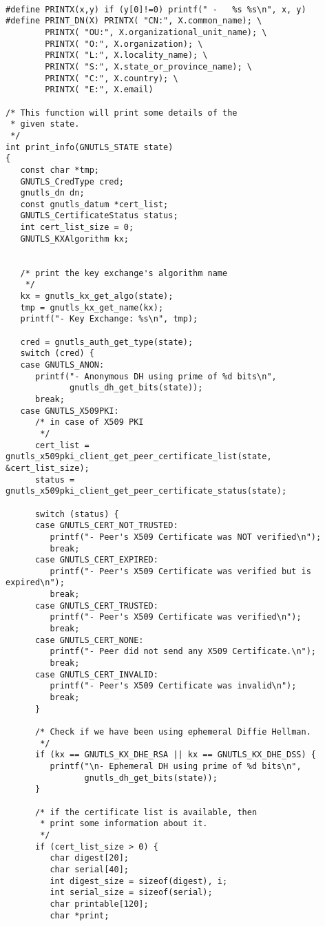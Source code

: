 \begin{verbatim}

#define PRINTX(x,y) if (y[0]!=0) printf(" -   %s %s\n", x, y)
#define PRINT_DN(X) PRINTX( "CN:", X.common_name); \
        PRINTX( "OU:", X.organizational_unit_name); \
        PRINTX( "O:", X.organization); \
        PRINTX( "L:", X.locality_name); \
        PRINTX( "S:", X.state_or_province_name); \
        PRINTX( "C:", X.country); \
        PRINTX( "E:", X.email)

/* This function will print some details of the
 * given state.
 */
int print_info(GNUTLS_STATE state)
{
   const char *tmp;
   GNUTLS_CredType cred;
   gnutls_dn dn;
   const gnutls_datum *cert_list;
   GNUTLS_CertificateStatus status;
   int cert_list_size = 0;
   GNUTLS_KXAlgorithm kx;


   /* print the key exchange's algorithm name
    */
   kx = gnutls_kx_get_algo(state);
   tmp = gnutls_kx_get_name(kx);
   printf("- Key Exchange: %s\n", tmp);

   cred = gnutls_auth_get_type(state);
   switch (cred) {
   case GNUTLS_ANON:
      printf("- Anonymous DH using prime of %d bits\n",
             gnutls_dh_get_bits(state));
      break;
   case GNUTLS_X509PKI:
      /* in case of X509 PKI
       */
      cert_list = gnutls_x509pki_client_get_peer_certificate_list(state, &cert_list_size);
      status = gnutls_x509pki_client_get_peer_certificate_status(state);

      switch (status) {
      case GNUTLS_CERT_NOT_TRUSTED:
         printf("- Peer's X509 Certificate was NOT verified\n");
         break;
      case GNUTLS_CERT_EXPIRED:
         printf("- Peer's X509 Certificate was verified but is expired\n");
         break;
      case GNUTLS_CERT_TRUSTED:
         printf("- Peer's X509 Certificate was verified\n");
         break;
      case GNUTLS_CERT_NONE:
         printf("- Peer did not send any X509 Certificate.\n");
         break;
      case GNUTLS_CERT_INVALID:
         printf("- Peer's X509 Certificate was invalid\n");
         break;
      }

      /* Check if we have been using ephemeral Diffie Hellman.
       */
      if (kx == GNUTLS_KX_DHE_RSA || kx == GNUTLS_KX_DHE_DSS) {
         printf("\n- Ephemeral DH using prime of %d bits\n",
                gnutls_dh_get_bits(state));
      }

      /* if the certificate list is available, then
       * print some information about it.
       */
      if (cert_list_size > 0) {
         char digest[20];
         char serial[40];
         int digest_size = sizeof(digest), i;
         int serial_size = sizeof(serial);
         char printable[120];
         char *print;


\end{verbatim}
